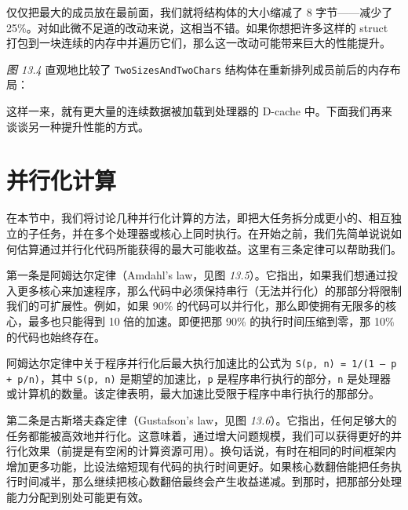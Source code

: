 \label{idx:1231}
仅仅把最大的成员放在最前面，我们就将结构体的大小缩减了 8 字节——减少了 25\%。对如此微不足道的改动来说，这相当不错。如果你想把许多这样的 struct 打包到一块连续的内存中并遍历它们，那么这一改动可能带来巨大的性能提升。

\emph{图 13.4} 直观地比较了 \texttt{Two\allowbreak{}Sizes\allowbreak{}And\allowbreak{}Two\allowbreak{}Chars} 结构体在重新排列成员前后的内存布局：


这样一来，就有更大量的连续数据被加载到处理器的 D-cache 中。下面我们再来谈谈另一种提升性能的方式。

\section{并行化计算}

\label{idx:1232}
在本节中，我们将讨论几种并行化计算的方法，即把大任务拆分成更小的、相互独立的子任务，并在多个处理器或核心上同时执行。在开始之前，我们先简单说说如何估算通过并行化代码所能获得的最大可能收益。这里有三条定律可以帮助我们。

第一条是阿姆达尔定律（Amdahl's law，见图 \emph{13.5}）。它指出，如果我们想通过投入更多核心来加速程序，那么代码中必须保持串行（无法并行化）的那部分将限制我们的可扩展性。例如，如果 90\% 的代码可以并行化，那么即使拥有无限多的核心，最多也只能得到 10 倍的加速。即便把那 90\% 的执行时间压缩到零，那 10\% 的代码也始终存在。


\label{idx:1233}
阿姆达尔定律中关于程序并行化后最大执行加速比的公式为 \texttt{S(\allowbreak{}p,\allowbreak{} n)\allowbreak{} =\allowbreak{} 1/\allowbreak{}(\allowbreak{}1 – p +\allowbreak{} p/\allowbreak{}n)\allowbreak{}}，其中 \texttt{S(p, n)} 是期望的加速比，\texttt{p} 是程序串行执行的部分，\texttt{n} 是处理器或计算机的数量。该定律表明，最大加速比受限于程序中串行执行的那部分。

第二条是古斯塔夫森定律（Gustafson's law，见图 \emph{13.6}）。它指出，任何足够大的任务都能被高效地并行化。这意味着，通过增大问题规模，我们可以获得更好的并行化效果（前提是有空闲的计算资源可用）。换句话说，有时在相同的时间框架内增加更多功能，比设法缩短现有代码的执行时间更好。如果核心数翻倍能把任务执行时间减半，那么继续把核心数翻倍最终会产生收益递减。到那时，把那部分处理能力分配到别处可能更有效。


